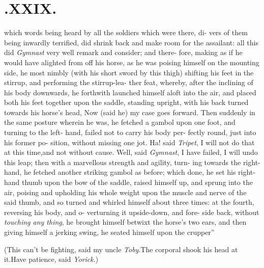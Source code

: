 \documentclass{article}
\begin{document}
\section{.\enspace  XXIX.}

\quad\tsh\lqq which words being heard by\break
\lqq all the soldiers which were there, di-\break
\lqq vers of them being inwardly terrified,\break
\lqq did shrink back and make room for\break
\lqq the assailant: all this did \textit{Gymnast} very\break
\lqq well remark and consider; and there-\break
\lqq fore, making as if he would have\break
\lqq alighted from off his horse, as he was\break
\lqq poising himself on the mounting side,\break
\lqq he most nimbly (with his short sword\break
\lqq by this thigh) shifting his feet in the
\lqq stirrup, and performing the stirrup-lea-\break
\lqq ther feat, whereby, after the inclining\break
\lqq of his body downwards, he forthwith\break
\lqq launched himself aloft into the air, and\break
\lqq placed both his feet together upon the\break
\lqq saddle, standing upright, with his\break
\lqq back turned towards his horse’s head,\break
\lqq \tsk Now (said he) my case goes forward.\break
\lqq Then suddenly in the same posture\break
\lqq wherein he was, he fetched a gambol\break
\lqq upon one foot, and turning to the left-\break
\lqq hand, failed not to carry his body per-\break
\lqq fectly round, just into his former po-\break
\lqq sition, without missing one jot.\tsh\break
\lqq Ha!  said \textit{Tripet}, I will not do that\break
\lqq at this time,\tsk and not without cause.\break
\lqq Well, said \textit{Gymnast}, I have failed,\tsk\break
\lqq I will undo this leap; then with a\break
\lqq marvellous strength and agility, turn-\break
\lqq ing towards the right-hand, he fetched\break
\lqq another striking gambol as before;\break
\lqq which done, he set his right-hand\break
\lqq thumb upon the bow of the saddle,
\lqq raised himself up, and sprung into the\break
\lqq air, poising and upholding his whole\break
\lqq weight upon the muscle and nerve of\break
\lqq the said thumb, and so turned and\break
\lqq whirled himself about three times: at\break
\lqq the fourth, reversing his body, and o-\break
\lqq verturning it upside-down, and fore-\break
\lqq side back, without \textit{touching any thing},\break
\lqq he brought himself betwixt the horse’s\break
\lqq two ears, and then giving himself a\break
\lqq jerking swing, he seated himself upon\break
\lqq the crupper\tsh ”

(This can’t be fighting, said my uncle\break
\textit{Toby}.\tsh The corporal shook his head\break
at it.\tsh Have patience, said \textit{Yorick}.)
\end{document}
